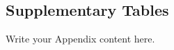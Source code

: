 \begin{landscape}

\chapter{Supplementary Tables} %

\label{AppendixA} %

Write your Appendix content here.

\end{landscape}